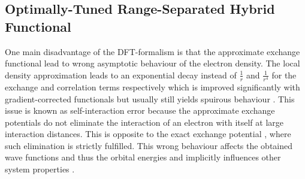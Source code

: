 \subsection{Optimally-Tuned Range-Separated Hybrid Functional}
\label{ch:otrsh}
One main disadvantage of the DFT-formalism is that the approximate exchange functional lead to wrong asymptotic behaviour of the electron density.
The local density approximation leads to an exponential decay instead of $\frac 1r$ and $\frac{1}{r^4}$ for the exchange and correlation terms respectively \cite{Bokareva} which is improved significantly with gradient-corrected functionals but usually still yields spuirous behaviour \cite{baerRSH}.
This issue is known as self-interaction error because the approximate exchange potentials do not eliminate the interaction of an electron with itself at large interaction distances.
This is opposite to the exact exchange potential , where such elimination is strictly fulfilled.
This wrong behaviour affects the obtained wave functions and thus the orbital energies and implicitly influences other system properties \cite{OT-RSH}.

